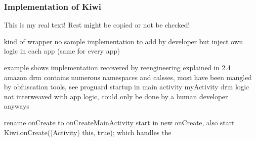 \subsubsection{Implementation of Kiwi} \label{section:license-amazon-implementation}
This is my real text! Rest might be copied or not be checked!

%
kind of wrapper
no sample implementation to add by developer but inject own logic in each app (same for every app)

example shows implementation recovered by reengineering explained in 2.4
amazon drm contains numerous namespaces and calsses, most have been mangled by obfuscation tools, see proguard
startup in main activity myActivity
drm logic not interweaved with app logic, could only be done by a human developer anyways

\cite{munteanLicense}
%




rename onCreate to onCreateMainActivity
start in new onCreate, also start Kiwi.onCreate((Activity) this, true); which handles the
